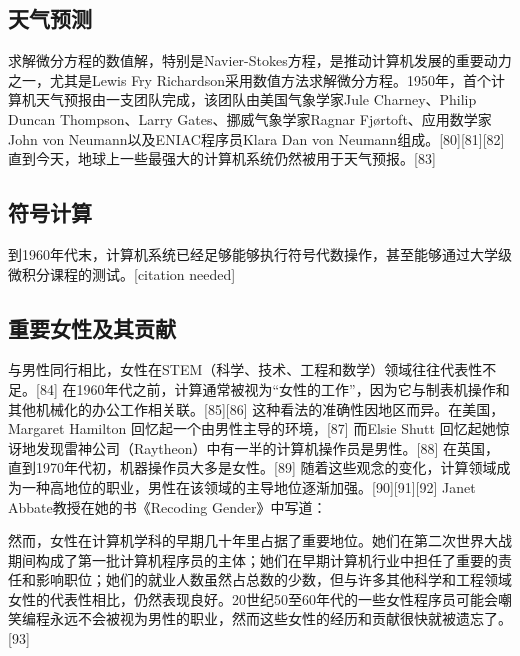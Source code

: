\subsection{天气预测}  
求解微分方程的数值解，特别是Navier-Stokes方程，是推动计算机发展的重要动力之一，尤其是Lewis Fry Richardson采用数值方法求解微分方程。1950年，首个计算机天气预报由一支团队完成，该团队由美国气象学家Jule Charney、Philip Duncan Thompson、Larry Gates、挪威气象学家Ragnar Fjørtoft、应用数学家John von Neumann以及ENIAC程序员Klara Dan von Neumann组成。[80][81][82] 直到今天，地球上一些最强大的计算机系统仍然被用于天气预报。[83]
\subsection{符号计算}  
到1960年代末，计算机系统已经足够能够执行符号代数操作，甚至能够通过大学级微积分课程的测试。[citation needed]
\subsection{重要女性及其贡献}  
与男性同行相比，女性在STEM（科学、技术、工程和数学）领域往往代表性不足。[84] 在1960年代之前，计算通常被视为“女性的工作”，因为它与制表机操作和其他机械化的办公工作相关联。[85][86] 这种看法的准确性因地区而异。在美国，Margaret Hamilton 回忆起一个由男性主导的环境，[87] 而Elsie Shutt 回忆起她惊讶地发现雷神公司（Raytheon）中有一半的计算机操作员是男性。[88] 在英国，直到1970年代初，机器操作员大多是女性。[89] 随着这些观念的变化，计算领域成为一种高地位的职业，男性在该领域的主导地位逐渐加强。[90][91][92] Janet Abbate教授在她的书《Recoding Gender》中写道：

然而，女性在计算机学科的早期几十年里占据了重要地位。她们在第二次世界大战期间构成了第一批计算机程序员的主体；她们在早期计算机行业中担任了重要的责任和影响职位；她们的就业人数虽然占总数的少数，但与许多其他科学和工程领域女性的代表性相比，仍然表现良好。20世纪50至60年代的一些女性程序员可能会嘲笑编程永远不会被视为男性的职业，然而这些女性的经历和贡献很快就被遗忘了。[93]

